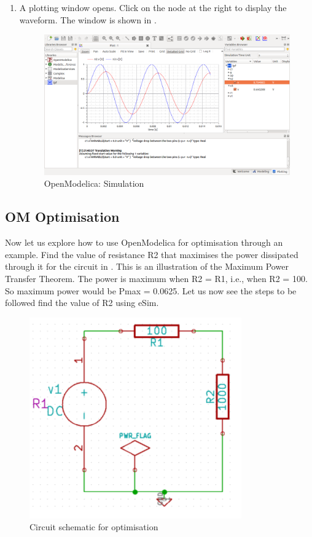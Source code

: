 \begin{enumerate}
\item A plotting window opens. Click on the node at the right to display the waveform. The window is shown in .

\begin{figure}[h]
\centering
\includegraphics[width=\lgfig]{list_of_figures/7.png}
\caption{OpenModelica: Simulation}
\label{om-simulation}
\end{figure}

\end{enumerate}

\subsection {OM Optimisation}

Now let us explore how to use OpenModelica for optimisation through an example. Find the value of resistance R2 that maximises the power dissipated through it for the circuit in . This is an illustration of the Maximum Power Transfer Theorem. The power is maximum when R2 = R1, i.e., when R2 = 100. So maximum power would be Pmax = 0.0625. Let us now see the steps to be followed find the value of R2 using eSim.

\begin{figure}[h]
\centering
\includegraphics[width=\lgfig]{list_of_figures/8.png}
\caption{Circuit schematic for optimisation}
\label{optim-circuit}
\end{figure}

